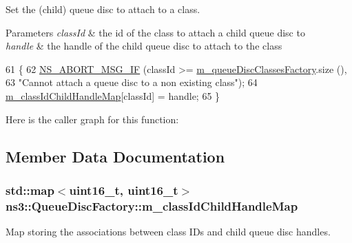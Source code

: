 Set the (child) queue disc to attach to a class. 


\begin{DoxyParams}{Parameters}
{\em class\+Id} & the id of the class to attach a child queue disc to \\
\hline
{\em handle} & the handle of the child queue disc to attach to the class \\
\hline
\end{DoxyParams}

\begin{DoxyCode}
61 \{
62   \hyperlink{group__fatal_ga6653324225bc139e46deea177614ceee}{NS\_ABORT\_MSG\_IF} (classId >= \hyperlink{classns3_1_1QueueDiscFactory_ad173551ed51d3398656bc755a7e28290}{m\_queueDiscClassesFactory}.size (),
63                    \textcolor{stringliteral}{"Cannot attach a queue disc to a non existing class"});
64   \hyperlink{classns3_1_1QueueDiscFactory_ab2b0a6cfbbd588b14617fcf5079311b2}{m\_classIdChildHandleMap}[classId] = handle;
65 \}
\end{DoxyCode}


Here is the caller graph for this function\+:




\subsection{Member Data Documentation}
\subsubsection[{\texorpdfstring{m\+\_\+class\+Id\+Child\+Handle\+Map}{m_classIdChildHandleMap}}]{\setlength{\rightskip}{0pt plus 5cm}std\+::map$<$uint16\+\_\+t, uint16\+\_\+t$>$ ns3\+::\+Queue\+Disc\+Factory\+::m\+\_\+class\+Id\+Child\+Handle\+Map\hspace{0.3cm}{\ttfamily [private]}}\hypertarget{classns3_1_1QueueDiscFactory_ab2b0a6cfbbd588b14617fcf5079311b2}{}\label{classns3_1_1QueueDiscFactory_ab2b0a6cfbbd588b14617fcf5079311b2}


Map storing the associations between class I\+Ds and child queue disc handles. 

